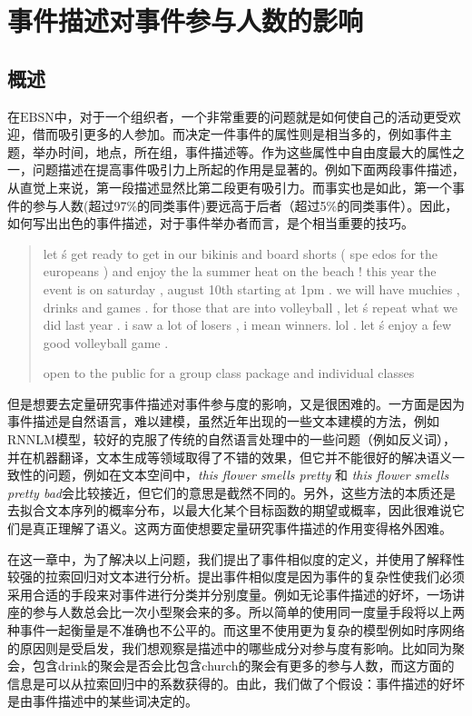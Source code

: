 \documentclass[12pt]{template}
\begin{document}
\section{事件描述对事件参与人数的影响} 
\subsection{概述} 
在$\mathrm{EBSN}$中，对于一个组织者，一个非常重要的问题就是如何使自己的活动更受欢迎，借而吸引更多的人参加。而决定一件事件的属性则是相当多的，例如事件主题，举办时间，地点，所在组，事件描述等。作为这些属性中自由度最大的属性之一，问题描述在提高事件吸引力上所起的作用是显著的。例如下面两段事件描述，从直觉上来说，第一段描述显然比第二段更有吸引力。而事实也是如此，第一个事件的参与人数(超过97\%的同类事件)要远高于后者（超过5\%的同类事件）。因此，如何写出出色的事件描述，对于事件举办者而言，是个相当重要的技巧。
 
\begin{quotation}
  let  \'s get ready to get in our bikinis and board shorts  (  spe
  edos for the europeans  )  and enjoy the la summer heat on the beach
  !  this year the event is on saturday  ,  august 10th starting at 
  1pm . we will have muchies  ,  drinks and games . for those that 
  are into volleyball  ,  let  \'s repeat what we did last year . 
  i saw a lot of losers  ,  i mean winners. lol . let  \'s enjoy 
  a few good volleyball game .
    
  open to the public for a group class package and individual classes
\end{quotation}

但是想要去定量研究事件描述对事件参与度的影响，又是很困难的。一方面是因为事件描述是自然语言，难以建模，虽然近年出现的一些文本建模的方法，例如RNNLM模型，较好的克服了传统的自然语言处理中的一些问题（例如反义词），并在机器翻译，文本生成等领域取得了不错的效果，但它并不能很好的解决语义一致性的问题，例如在文本空间中，\textit{this flower smells pretty} 和 \textit{this flower smells pretty bad}会比较接近，但它们的意思是截然不同的。另外，这些方法的本质还是去拟合文本序列的概率分布，以最大化某个目标函数的期望或概率，因此很难说它们是真正理解了语义。这两方面使想要定量研究事件描述的作用变得格外困难。

在这一章中，为了解决以上问题，我们提出了事件相似度的定义，并使用了解释性较强的拉索回归对文本进行分析。提出事件相似度是因为事件的复杂性使我们必须采用合适的手段来对事件进行分类并分别度量。例如无论事件描述的好坏，一场讲座的参与人数总会比一次小型聚会来的多。所以简单的使用同一度量手段将以上两种事件一起衡量是不准确也不公平的。而这里不使用更为复杂的模型例如时序网络的原因则是受\citep{noauthor_predicting_nodate}启发，我们想观察是描述中的哪些成分对参与度有影响。比如同为聚会，包含drink的聚会是否会比包含church的聚会有更多的参与人数，而这方面的信息是可以从拉索回归中的系数获得的。由此，我们做了个假设：事件描述的好坏是由事件描述中的某些词决定的。
\end{document}
